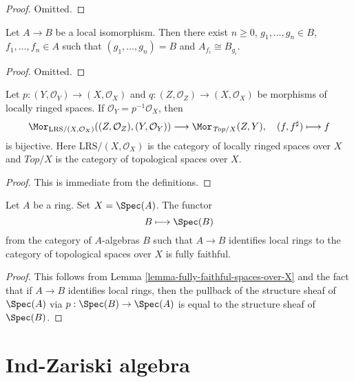 \begin{proof}
Omitted.
\end{proof}

\begin{lemma}
\label{lemma-structure-local-isomorphism}
Let $A \to B$ be a local isomorphism. Then there exist $n \geq 0$,
$g_1, \ldots, g_n \in B$, $f_1, \ldots, f_n \in A$ such that
$(g_1, \ldots, g_n) = B$ and $A_{f_i} \cong B_{g_i}$.
\end{lemma}

\begin{proof}
Omitted.
\end{proof}

\begin{lemma}
\label{lemma-fully-faithful-spaces-over-X}
Let $p : (Y, \mathcal{O}_Y) \to (X, \mathcal{O}_X)$ and
$q : (Z, \mathcal{O}_Z) \to (X, \mathcal{O}_X)$
be morphisms of locally ringed spaces.
If $\mathcal{O}_Y = p^{-1}\mathcal{O}_X$, then
$$
\Mor_{\text{LRS}/(X, \mathcal{O}_X)}((Z, \mathcal{O}_Z), (Y, \mathcal{O}_Y))
\longrightarrow
\Mor_{\textit{Top}/X}(Z, Y),\quad
(f, f^\sharp) \longmapsto f
$$
is bijective. Here $\text{LRS}/(X, \mathcal{O}_X)$ is the category of
locally ringed spaces over $X$ and $\textit{Top}/X$ is the category
of topological spaces over $X$.
\end{lemma}

\begin{proof}
This is immediate from the definitions.
\end{proof}

\begin{lemma}
\label{lemma-local-isomorphism-fully-faithful}
Let $A$ be a ring. Set $X = \Spec(A)$. The functor
$$
B \longmapsto \Spec(B)
$$
from the category of $A$-algebras $B$ such that $A \to B$ identifies
local rings to the category of
topological spaces over $X$ is fully faithful.
\end{lemma}

\begin{proof}
This follows from Lemma \ref{lemma-fully-faithful-spaces-over-X}
and the fact that if $A \to B$ identifies local rings, then the pullback
of the structure sheaf of $\Spec(A)$ via $p : \Spec(B) \to \Spec(A)$
is equal to the structure sheaf of $\Spec(B)$.
\end{proof}




\section{Ind-Zariski algebra}
\label{section-ind-zariski}

